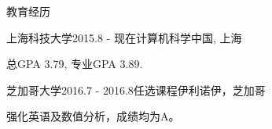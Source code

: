 \documentclass{resume} %
\begin{document}

\begin{rSection}{教育经历}

\begin{rSubsection}
  {上海科技大学}{2015.8 - 现在}{计算机科学}{中国, 上海}
    \item 总GPA 3.79, 专业GPA 3.89.
\end{rSubsection}


\begin{rSubsection}
  {芝加哥大学}{2016.7 - 2016.8}{任选课程}{伊利诺伊，芝加哥}
    \item 强化英语及数值分析，成绩均为A。
\end{rSubsection}

\end{rSection}
\end{document}
